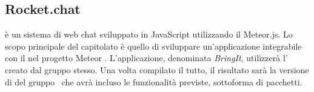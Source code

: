 \subsection{Rocket.chat}
 è un sistema di web chat sviluppato in JavaScript utilizzando il  Meteor.js. Lo scopo principale del capitolato è quello di sviluppare un'applicazione integrabile con il   nel progetto Meteor . L'applicazione, denominata \textit{BringIt}, utilizzerà l' creato dal gruppo stesso. Una volta compilato il tutto, il risultato sarà la versione di  del gruppo \gruppo\ che avrà incluso le funzionalità previste, sottoforma di pacchetti.